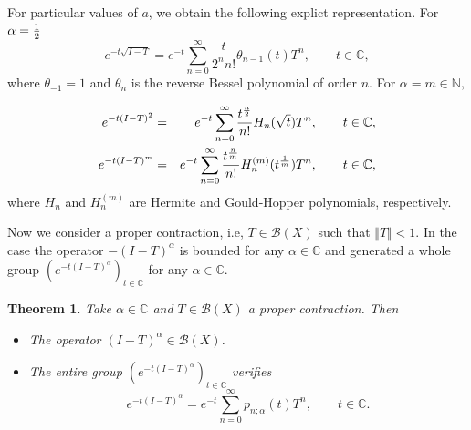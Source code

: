 \documentclass[a4paper,12pt]{amsart}
\def\NN{\mathbb N}
\def\CC{\mathbb C}
\def\CC{\mathbb C}
\newtheorem{theorem}[thm]{Theorem}
\theoremstyle{definition}
\theoremstyle{remark}
\begin{document}
 For particular values of $a$, we obtain the following explict representation. For $\alpha={1\over 2}$
$$
 e^{-t\sqrt{I-T}}=e^{-t}\sum_{n=0}^\infty \frac{t}{2^n n!}\theta_{n-1}(t)T^n, \qquad t\in \CC,
$$
where $\theta_{-1}=1$ and $\theta_{n}$ is the reverse Bessel polynomial of order $n$. For $\alpha=m\in \NN, $




\begin{eqnarray*}
e^{-t(I-T)^2}&=&e^{-t}\sum_{n=0}^\infty{{t}^{n\over 2}\over n!}H_n(\sqrt{t})T^n, \qquad t\in \CC,\\
e^{-t(I-T)^m}&=&e^{-t}\sum_{n=0}^\infty{{t}^{n\over m}\over n!}H_n^{(m)}(t^{1\over m})T^n, \qquad t\in \CC,
\end{eqnarray*}
where $H_n$ and $H_n^{(m)}$ are Hermite and Gould-Hopper polynomials, respectively.



Now we consider a proper contraction, i.e, $T\in {\mathcal B}(X)$ such that $\Vert T\Vert<1$. In the case the operator $-(I-T)^\alpha$ is  bounded for any $\alpha\in \CC$ and generated a whole group $ (e^{-t(I-T)^\alpha})_{t\in \CC}$ for any $\alpha\in \CC$.


\begin{theorem}\label{poww2}  Take $ \alpha \in \CC$ and $T\in {\mathcal B}(X)$ a proper contraction. Then
\begin{itemize}
\item[(i)] The operator $(I-T)^{\alpha}\in {\mathcal B}(X)$.

\item[(ii)] The entire group $(e^{-t(I-T)^\alpha})_{t\in \CC}$ verifies
$$
e^{-t(I-T)^\alpha}=e^{-t} \sum_{n=0}^\infty p_{n;\alpha}(t)T^n, \qquad t\in \CC.
$$
\end{itemize}

\end{theorem}
\end{document}
